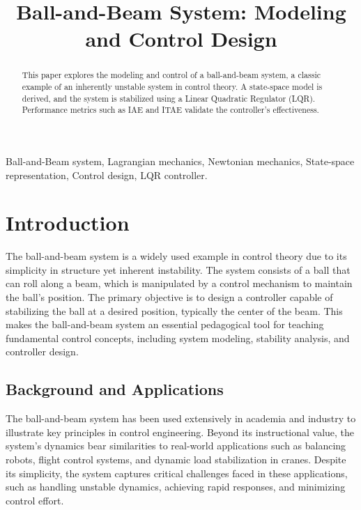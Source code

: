\documentclass[conference]{IEEEtran}
\begin{document}
\title{Ball-and-Beam System: Modeling and Control Design}

\author{
}

\maketitle

\begin{abstract}
    This paper explores the modeling and control of a ball-and-beam system, a classic example of an inherently unstable system in control theory. A state-space model is derived, and the system is stabilized using a Linear Quadratic Regulator (LQR). Performance metrics such as IAE and ITAE validate the controller's effectiveness.
\end{abstract}

\begin{IEEEkeywords}
Ball-and-Beam system, Lagrangian mechanics, Newtonian mechanics, State-space representation, Control design, LQR controller.
\end{IEEEkeywords}

\section{Introduction}
\label{sec:intro}
The ball-and-beam system is a widely used example in control theory due to its simplicity in structure yet inherent instability. The system consists of a ball that can roll along a beam, which is manipulated by a control mechanism to maintain the ball's position. The primary objective is to design a controller capable of stabilizing the ball at a desired position, typically the center of the beam. This makes the ball-and-beam system an essential pedagogical tool for teaching fundamental control concepts, including system modeling, stability analysis, and controller design.

\subsection{Background and Applications}
\label{subsec:background}
The ball-and-beam system has been used extensively in academia and industry to illustrate key principles in control engineering. Beyond its instructional value, the system's dynamics bear similarities to real-world applications such as balancing robots, flight control systems, and dynamic load stabilization in cranes. Despite its simplicity, the system captures critical challenges faced in these applications, such as handling unstable dynamics, achieving rapid responses, and minimizing control effort.
\end{document}
